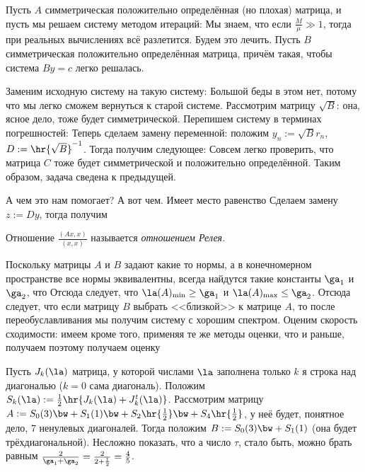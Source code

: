 \documentclass[a4paper]{article}
\begin{document}
Пусть $A$ симметрическая положительно определённая (но плохая)
матрица, и пусть мы решаем систему методом итераций:
  Мы знаем, что если
$\frac{M}{\mu} \gg 1$, тогда при реальных вычислениях всё
разлетится. Будем это лечить. Пусть $B$ симметрическая положительно
определённая матрица, причём такая, чтобы система $By = c$ легко
решалась.

Заменим исходную систему на такую систему:   Большой беды в этом нет, потому что мы
легко сможем вернуться к старой системе.  Рассмотрим матрицу
$\sqrt{B}$: она, ясное дело, тоже будет симметрической.  Перепишем
систему в терминах погрешностей:   Теперь сделаем замену переменной: положим $y_n :=
\sqrt{B} r_n$, $D := \hr{\sqrt{B}}^{-1}$.  Тогда получим следующее:
  Совсем
легко проверить, что матрица $C$ тоже будет симметрической и
положительно определённой.  Таким образом, задача сведена к
предыдущей.

А чем это нам помогает? А вот чем. Имеет место равенство   Сделаем
замену $z := Dy$, тогда получим 

\begin{df}
Отношение $\frac{(Ax,x)}{(x,x)}$ называется \emph{отношением Релея}.
\end{df}

Поскольку матрицы $A$ и $B$ задают какие то нормы, а в конечномерном
пространстве все нормы эквивалентны, всегда найдутся такие константы
$\ga_1$ и $\ga_2$, что   Отсюда следует, что $\la(A)_{\min} \ge \ga_1$ и $\la(A)_{\max}
\le \ga_2$.  Отсюда следует, что если матрицу $B$ выбрать <<близкой>>
к матрице $A$, то после переобуславливания мы получим систему с
хорошим спектром. Оценим скорость сходимости: имеем  кроме того, применяя те
же методы оценки, что и раньше, получаем  поэтому получаем
оценку 

\begin{ex}
Пусть $J_k(\la)$ матрица, у которой числами $\la$ заполнена только $k$
я строка над диагональю ($k = 0$ сама диагональ).  Положим $S_k(\la)
:= \frac{1}{2}\hr{J_k(\la) + J_k^t(\la)}$.  Рассмотрим матрицу $A :=
S_0(3) \bw+ S_1(1) \bw+ S_2\hr{\frac12} \bw+ S_4\hr{\frac12}$, у неё
будет, понятное дело, $7$ ненулевых диагоналей. Тогда положим $B :=
S_0(3) \bw+ S_1(1)$ (она будет трёхдиагональной).  Несложно показать,
что  а число $\tau$, стало
быть, можно брать равным $\frac{2}{\ga_1 + \ga_2} = \frac{2}{2 +
  \frac12} = \frac45$.
\end{ex}
\end{document}

